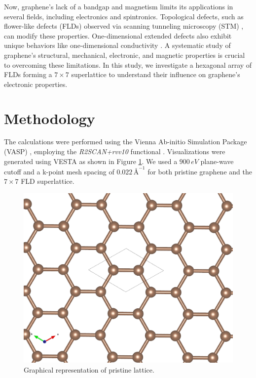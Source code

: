 \documentclass{article}
\begin{document}
Now, graphene's lack of a bandgap and magnetism limits its applications in several fields, including electronics and spintronics. Topological defects, such as flower-like defects (FLDs) observed via scanning tunneling microscopy (STM) \cite{cockayne2011}, can modify these properties. One-dimensional extended defects also exhibit unique behaviors like one-dimensional conductivity \cite{pinto2014}. A systematic study of graphene's structural, mechanical, electronic, and magnetic properties is crucial to overcoming these limitations. In this study, we investigate a hexagonal array of FLDs forming a $7\times7$ superlattice to understand their influence on graphene's electronic properties.


\section{Methodology}
The calculations were performed using the Vienna Ab-initio Simulation Package (VASP) \cite{kresse1996}, employing the \textit{R2SCAN+rvv10} functional \cite{furness2020}. Visualizations were generated using VESTA \cite{momma2011} as shown in Figure \ref{fig:pristine}. We used a $900 \, eV$ plane-wave cutoff and a k-point mesh spacing of $0.022 \, \si{\angstrom}^{-1}$ for both pristine graphene and the $7\times7$ FLD superlattice.


\begin{figure}[H]
  \centering
  \includegraphics[scale=0.15]{../figures/pristine_structure.png}
  \caption{Graphical representation of pristine lattice.}
  \label{fig:pristine}
\end{figure}
\end{document}

